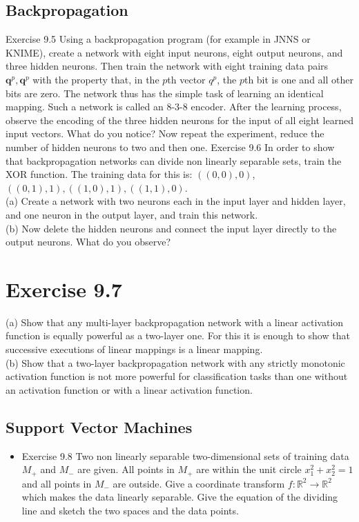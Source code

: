 \documentclass[10pt]{book}
\begin{document}
\subsection{Backpropagation}
Exercise 9.5 Using a backpropagation program (for example in JNNS or KNIME), create a network with eight input neurons, eight output neurons, and three hidden neurons. Then train the network with eight training data pairs $\boldsymbol{q}^{p}, \boldsymbol{q}^{p}$ with the property that, in the $p$th vector $q^{p}$, the $p$th bit is one and all other bits are zero. The network thus has the simple task of learning an identical mapping. Such a network is called an 8-3-8 encoder. After the learning process, observe the encoding of the three hidden neurons for the input of all eight learned input vectors. What do you notice? Now repeat the experiment, reduce the number of hidden neurons to two and then one.
Exercise 9.6 In order to show that backpropagation networks can divide non linearly separable sets, train the XOR function. The training data for this is: $((0,0), 0)$, $((0,1), 1),((1,0), 1),((1,1), 0)$.\\
(a) Create a network with two neurons each in the input layer and hidden layer, and one neuron in the output layer, and train this network.\\
(b) Now delete the hidden neurons and connect the input layer directly to the output neurons. What do you observe?

\section{Exercise 9.7}
(a) Show that any multi-layer backpropagation network with a linear activation function is equally powerful as a two-layer one. For this it is enough to show that successive executions of linear mappings is a linear mapping.\\
(b) Show that a two-layer backpropagation network with any strictly monotonic activation function is not more powerful for classification tasks than one without an activation function or with a linear activation function.

\subsection{Support Vector Machines}
\begin{itemize}
  \item Exercise 9.8 Two non linearly separable two-dimensional sets of training data $M_{+}$ and $M_{-}$ are given. All points in $M_{+}$ are within the unit circle $x_{1}^{2}+x_{2}^{2}=1$ and all points in $M_{-}$ are outside. Give a coordinate transform $f: \mathbb{R}^{2} \rightarrow \mathbb{R}^{2}$ which makes the data linearly separable. Give the equation of the dividing line and sketch the two spaces and the data points.
\end{itemize}
\end{document}
